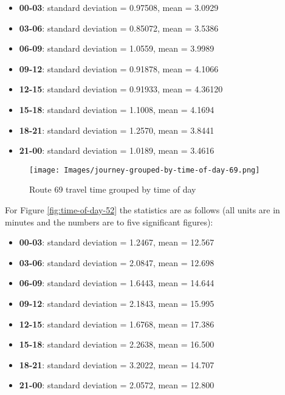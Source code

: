 \begin{itemize}
    \item \textbf{00-03}: standard deviation = 0.97508, mean = 3.0929
    \item \textbf{03-06}: standard deviation = 0.85072, mean = 3.5386
    \item \textbf{06-09}: standard deviation = 1.0559, mean = 3.9989
    \item \textbf{09-12}: standard deviation = 0.91878, mean = 4.1066
    \item \textbf{12-15}: standard deviation = 0.91933, mean = 4.36120
    \item \textbf{15-18}: standard deviation = 1.1008, mean = 4.1694
    \item \textbf{18-21}: standard deviation = 1.2570, mean = 3.8441
    \item \textbf{21-00}: standard deviation = 1.0189, mean = 3.4616
\end{itemize}

\begin{figure}[H]
\begin{center}
    \texttt{[image: Images/journey-grouped-by-time-of-day-69.png]}
    \caption{Route 69 travel time grouped by time of day}
    \label{fig:time-of-day-69}
\end{center}
\end{figure}

For Figure \ref{fig:time-of-day-52} the statistics are as follows (all units are in minutes and the numbers are to five significant figures):

\begin{itemize}
    \item \textbf{00-03}: standard deviation = 1.2467, mean = 12.567
    \item \textbf{03-06}: standard deviation = 2.0847, mean = 12.698
    \item \textbf{06-09}: standard deviation = 1.6443, mean = 14.644
    \item \textbf{09-12}: standard deviation = 2.1843, mean = 15.995
    \item \textbf{12-15}: standard deviation = 1.6768, mean = 17.386
    \item \textbf{15-18}: standard deviation = 2.2638, mean = 16.500
    \item \textbf{18-21}: standard deviation = 3.2022, mean = 14.707
    \item \textbf{21-00}: standard deviation = 2.0572, mean = 12.800
\end{itemize}

